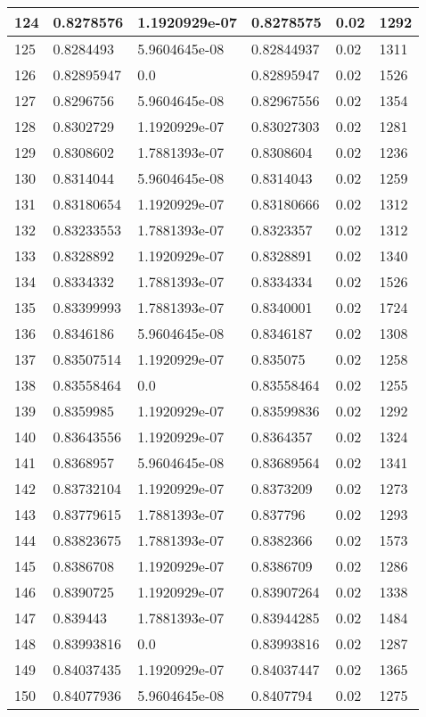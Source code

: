 \begin{longtable}{|l|l|l|l|l|l|}
124 & 0.8278576 & 1.1920929e-07 & 0.8278575 & 0.02 & 1292 \\ \hline 
125 & 0.8284493 & 5.9604645e-08 & 0.82844937 & 0.02 & 1311 \\ \hline 
126 & 0.82895947 & 0.0 & 0.82895947 & 0.02 & 1526 \\ \hline 
127 & 0.8296756 & 5.9604645e-08 & 0.82967556 & 0.02 & 1354 \\ \hline 
128 & 0.8302729 & 1.1920929e-07 & 0.83027303 & 0.02 & 1281 \\ \hline 
129 & 0.8308602 & 1.7881393e-07 & 0.8308604 & 0.02 & 1236 \\ \hline 
130 & 0.8314044 & 5.9604645e-08 & 0.8314043 & 0.02 & 1259 \\ \hline 
131 & 0.83180654 & 1.1920929e-07 & 0.83180666 & 0.02 & 1312 \\ \hline 
132 & 0.83233553 & 1.7881393e-07 & 0.8323357 & 0.02 & 1312 \\ \hline 
133 & 0.8328892 & 1.1920929e-07 & 0.8328891 & 0.02 & 1340 \\ \hline 
134 & 0.8334332 & 1.7881393e-07 & 0.8334334 & 0.02 & 1526 \\ \hline 
135 & 0.83399993 & 1.7881393e-07 & 0.8340001 & 0.02 & 1724 \\ \hline 
136 & 0.8346186 & 5.9604645e-08 & 0.8346187 & 0.02 & 1308 \\ \hline 
137 & 0.83507514 & 1.1920929e-07 & 0.835075 & 0.02 & 1258 \\ \hline 
138 & 0.83558464 & 0.0 & 0.83558464 & 0.02 & 1255 \\ \hline 
139 & 0.8359985 & 1.1920929e-07 & 0.83599836 & 0.02 & 1292 \\ \hline 
140 & 0.83643556 & 1.1920929e-07 & 0.8364357 & 0.02 & 1324 \\ \hline 
141 & 0.8368957 & 5.9604645e-08 & 0.83689564 & 0.02 & 1341 \\ \hline 
142 & 0.83732104 & 1.1920929e-07 & 0.8373209 & 0.02 & 1273 \\ \hline 
143 & 0.83779615 & 1.7881393e-07 & 0.837796 & 0.02 & 1293 \\ \hline 
144 & 0.83823675 & 1.7881393e-07 & 0.8382366 & 0.02 & 1573 \\ \hline 
145 & 0.8386708 & 1.1920929e-07 & 0.8386709 & 0.02 & 1286 \\ \hline 
146 & 0.8390725 & 1.1920929e-07 & 0.83907264 & 0.02 & 1338 \\ \hline 
147 & 0.839443 & 1.7881393e-07 & 0.83944285 & 0.02 & 1484 \\ \hline 
148 & 0.83993816 & 0.0 & 0.83993816 & 0.02 & 1287 \\ \hline 
149 & 0.84037435 & 1.1920929e-07 & 0.84037447 & 0.02 & 1365 \\ \hline 
150 & 0.84077936 & 5.9604645e-08 & 0.8407794 & 0.02 & 1275 \\ \hline 
\end{longtable}